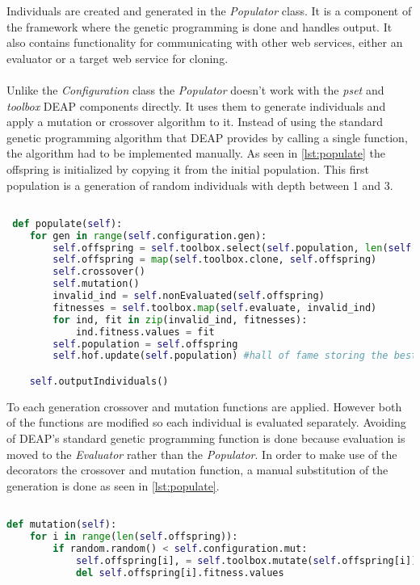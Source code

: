 Individuals are created and generated in the \textit{Populator} class. It is a component of the framework where
the genetic programming is done and handles output. It also contains functionality for communicating with other
web services, either an evaluator or a target web service for cloning.
\paragraph{}
Unlike the \textit{Configuration} class the \textit{Populator} doesn't work with the \textit{pset} and \textit{toolbox} DEAP
components directly. It uses them to generate individuals and apply a mutation or crossover algorithm to it. Instead of using
the standard genetic programming algorithm that DEAP provides by calling a single function, the algorithm had to be implemented 
manually. As seen in \ref{lst:populate} the offspring is initialized by copying it from the initial population. This first population is a
generation of random individuals with depth between 1 and 3. 

\begin{lstlisting}[language=Python,caption={Populate function responsible for generating individuals},label={lst:populate},breaklines=true]

 def populate(self):
    for gen in range(self.configuration.gen):
        self.offspring = self.toolbox.select(self.population, len(self.population))
        self.offspring = map(self.toolbox.clone, self.offspring)
        self.crossover()
        self.mutation()
        invalid_ind = self.nonEvaluated(self.offspring)
        fitnesses = self.toolbox.map(self.evaluate, invalid_ind)
        for ind, fit in zip(invalid_ind, fitnesses):
            ind.fitness.values = fit
        self.population = self.offspring
        self.hof.update(self.population) #hall of fame storing the best individuals is updated

    self.outputIndividuals()
\end{lstlisting}

To each generation crossover and mutation functions are applied. However both of the functions are modified so each
individual is evaluated separately. Avoiding of DEAP's standard genetic programming function is done because evaluation is
moved to the \textit{Evaluator} rather than the \textit{Populator}. In order to make use of the decorators the crossover
and mutation function, a manual substitution of the generation is done as seen in \ref{lst:populate}.

\begin{lstlisting}[language=Python,caption={Modified mutation method to substitute each parent with its children},label={lst:populate}]

def mutation(self):
    for i in range(len(self.offspring)):
        if random.random() < self.configuration.mut:
            self.offspring[i], = self.toolbox.mutate(self.offspring[i])
            del self.offspring[i].fitness.values
\end{lstlisting}